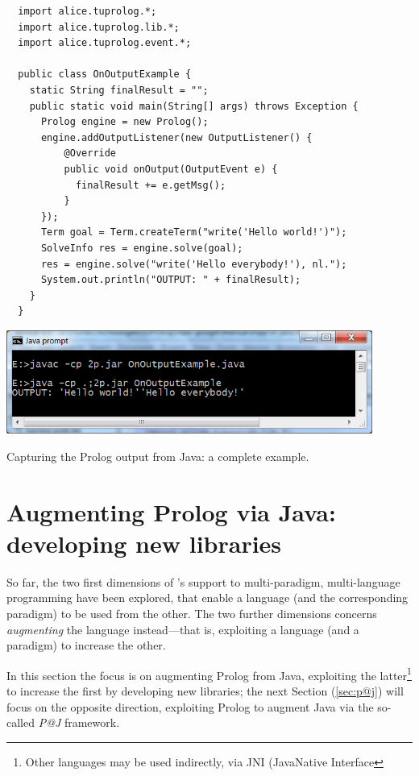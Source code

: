 \begin{table}[h]
{\small
\begin{verbatim}
  import alice.tuprolog.*;
  import alice.tuprolog.lib.*;
  import alice.tuprolog.event.*;

  public class OnOutputExample {
    static String finalResult = "";
    public static void main(String[] args) throws Exception {
      Prolog engine = new Prolog();
      engine.addOutputListener(new OutputListener() {
          @Override
          public void onOutput(OutputEvent e) {
            finalResult += e.getMsg();
          }
      });
      Term goal = Term.createTerm("write('Hello world!')");
      SolveInfo res = engine.solve(goal);
      res = engine.solve("write('Hello everybody!'), nl.");
      System.out.println("OUTPUT: " + finalResult);
    }
  }
\end{verbatim}}
\centering
  \includegraphics[width=12cm]{images/onOutput}
\caption{Capturing the Prolog output from Java: a complete example.}
\label{tab:capturing-output-complete}
\end{table}

\section{Augmenting Prolog via Java:\\developing new libraries}
\label{sec:howto-develop-libraries}

So far, the two first dimensions of \tuprolog{}'s support to multi-paradigm, multi-language programming have been explored, that enable a language (and the corresponding paradigm) to be used from the other.
The two further dimensions concerns \textit{augmenting} the language instead---that is, exploiting a language (and a paradigm) to increase the other.

In this section the focus is on augmenting Prolog from Java, exploiting the latter\footnote{%
 Other languages may be used indirectly, via JNI (JavaNative Interface}
to increase the first by developing new \tuprolog{} libraries; the next Section (\ref{sec:p@j}) will focus on the opposite direction, exploiting Prolog to augment Java via the so-called \textit{P@J} framework.

